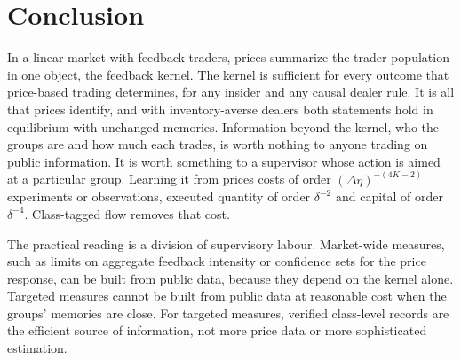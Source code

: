 \section{Conclusion}\label{sec:conclusion}

In a linear market with feedback traders, prices summarize the trader population in one object, the feedback kernel. The kernel is sufficient for every outcome that price-based trading determines, for any insider and any causal dealer rule. It is all that prices identify, and with inventory-averse dealers both statements hold in equilibrium with unchanged memories. Information beyond the kernel, who the groups are and how much each trades, is worth nothing to anyone trading on public information. It is worth something to a supervisor whose action is aimed at a particular group. Learning it from prices costs of order $(\Delta\eta)^{-(4K-2)}$ experiments or observations, executed quantity of order $\delta^{-2}$ and capital of order $\delta^{-4}$. Class-tagged flow removes that cost.

The practical reading is a division of supervisory labour. Market-wide measures, such as limits on aggregate feedback intensity or confidence sets for the price response, can be built from public data, because they depend on the kernel alone. Targeted measures cannot be built from public data at reasonable cost when the groups' memories are close. For targeted measures, verified class-level records are the efficient source of information, not more price data or more sophisticated estimation.
